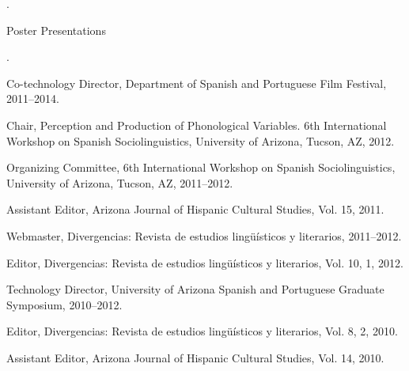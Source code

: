 \documentclass[11pt]{article}
\begin{document}
\noindent {}. \\ 


\medskip


\ind Poster Presentations \\ \vspace{-0.1in}

\noindent {}.
 

\bigskip 


\medskip
\noindent Co-technology Director, Department of Spanish and Portuguese Film Festival, 2011--2014. \\ \vspace{-0.1in}

\noindent Chair, Perception and Production of Phonological Variables. 6th International Workshop on Spanish Sociolinguistics, University of Arizona, Tucson, AZ, 2012. \\ \vspace{-0.1in}

\noindent Organizing Committee, 6th International Workshop on Spanish Sociolinguistics, University of Arizona, Tucson, AZ, 2011--2012.  \\ \vspace{-0.1in}

\noindent Assistant Editor, Arizona Journal of Hispanic Cultural Studies, Vol. 15, 2011. \\ \vspace{-0.1in}

\noindent Webmaster, Divergencias: Revista de estudios lingüísticos y literarios, 2011--2012. \\ \vspace{-0.1in}

\noindent Editor, Divergencias: Revista de estudios lingüísticos y literarios, Vol. 10, 1, 2012. \\ \vspace{-0.1in}

\noindent Technology Director, University of Arizona Spanish and Portuguese Graduate Symposium, 2010--2012. \\ \vspace{-0.1in}

\noindent Editor, Divergencias: Revista de estudios lingüísticos y literarios, Vol. 8, 2, 2010. \\ \vspace{-0.1in}

\noindent Assistant Editor, Arizona Journal of Hispanic Cultural Studies, Vol. 14, 2010.
\end{document}
